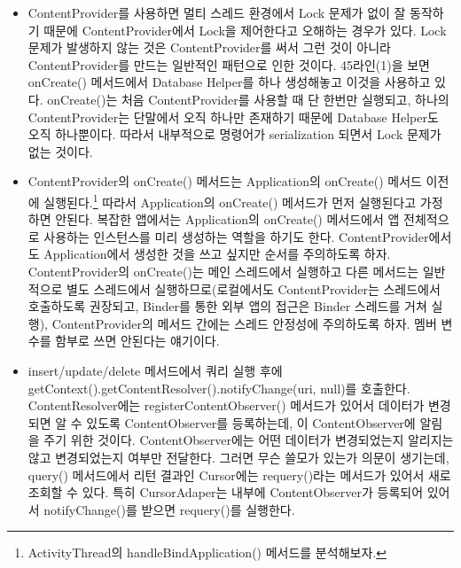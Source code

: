 \begin{itemize}
\item ContentProvider를 사용하면 멀티 스레드 환경에서 Lock 문제가 없이 잘 동작하기 때문에 ContentProvider에서 Lock을 제어한다고 오해하는 경우가 있다. 
Lock 문제가 발생하지 않는 것은 ContentProvider를 써서 그런 것이 아니라 ContentProvider를 만드는 일반적인 패턴으로 인한 것이다.
45라인(1)을 보면 onCreate() 메서드에서 Database Helper를 하나 생성해놓고 이것을 사용하고 있다.
onCreate()는 처음 ContentProvider를 사용할 때 단 한번만 실행되고, 하나의 ContentProvider는 단말에서 오직 하나만 존재하기 때문에 Database Helper도 오직 하나뿐이다. 따라서 내부적으로 명령어가 serialization 되면서 Lock 문제가 없는 것이다.

\item ContentProvider의 onCreate() 메서드는 Application의 onCreate() 메서드 이전에 실행된다.\footnote{ActivityThread의 handleBindApplication() 메서드를 분석해보자.}
따라서 Application의 onCreate() 메서드가 먼저 실행된다고 가정하면 안된다.
복잡한 앱에서는 Application의 onCreate() 메서드에서 앱 전체적으로 사용하는 인스턴스를 미리 생성하는 역할을 하기도 한다. ContentProvider에서도 Application에서 생성한 것을 쓰고 싶지만 순서를 주의하도록 하자.
ContentProvider의 onCreate()는 메인 스레드에서 실행하고 다른 메서드는 일반적으로 별도 스레드에서 실행하므로(로컬에서도 ContentProvider는 스레드에서 호출하도록 권장되고, Binder를 통한 외부 앱의 접근은 Binder 스레드를 거쳐 실행), ContentProvider의 메서드 간에는 스레드 안정성에 주의하도록 하자. 멤버 변수를 함부로 쓰면 안된다는 얘기이다.

\item insert/update/delete 메서드에서 쿼리 실행 후에 getContext().getContentResolver().notifyChange(uri, null)를 호출한다. ContentResolver에는 registerContentObserver() 메서드가 있어서 데이터가 변경되면 알 수 있도록 ContentObserver를 등록하는데, 이 ContentObserver에 알림을 주기 위한 것이다. 
ContentObserver에는 어떤 데이터가 변경되었는지 알리지는 않고 변경되었는지 여부만 전달한다. 
그러면 무슨 쓸모가 있는가 의문이 생기는데,
query() 메서드에서 리턴 결과인 Cursor에는 requery()라는 메서드가 있어서 새로 조회할 수 있다. 특히 CursorAdaper는 내부에 ContentObserver가 등록되어 있어서 notifyChange()를 받으면 requery()를 실행한다.

\end{itemize}

